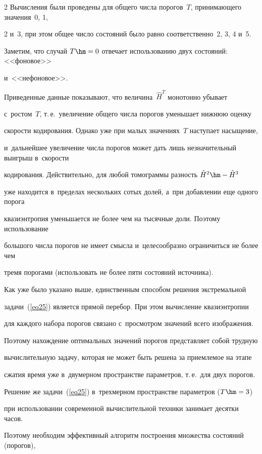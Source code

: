 \begin{multicols}{2}
Вычисления были проведены для общего числа порогов~$T$, принимающего значения~0, 1, 

2 и~3, при этом общее число состояний было равно соответственно~2, 3, 4 и~5. 

Заметим, что случай $T\hm=0$ отвечает использованию двух состояний: <<фоновое>> 

и~<<нефоновое>>.





Приведенные данные показывают, что величина~$\hat{H}^T$ монотонно убывает 

с~ростом~$T$, т.\,е.\ увеличение общего числа порогов уменьшает нижнюю оценку 

скорости кодирования. Однако уже при малых значениях~$T$ наступает насыщение, 

и~дальнейшее увеличение числа порогов может дать лишь незначительный выигрыш в~скорости 

кодирования. Действительно, для любой томограммы разность $\hat{H}^2\hm-\hat{H}^3$ 

уже находится в~пределах нескольких сотых долей, а~при добавлении еще одного порога 

квазиэнтропия уменьшается не более чем на тысячные доли. Поэтому использование 

большого числа порогов не имеет смысла и~целесообразно ограничиться не более чем 

тремя порогами (использовать не более пяти состояний источника).



Как уже было указано выше, единственным способом решения экстремальной 

задачи~(\ref{eq25}) является прямой перебор. При этом вычисление квазиэнтропии 

для каждого набора порогов связано с~просмотром значений всего изображения. 

Поэтому нахождение оптимальных значений порогов представляет собой трудную 

вычислительную задачу, которая не может быть решена за приемлемое на этапе 

сжатия время уже в~двумерном пространстве параметров, т.\,е.\ для двух порогов. 

Решение же задачи~(\ref{eq25}) в~трехмерном пространстве параметров ($T\hm=3$) 

при использовании современной вычислительной техники занимает десятки часов. 

Поэтому необходим эффективный алгоритм построения множества состояний (порогов), 


\end{multicols}
